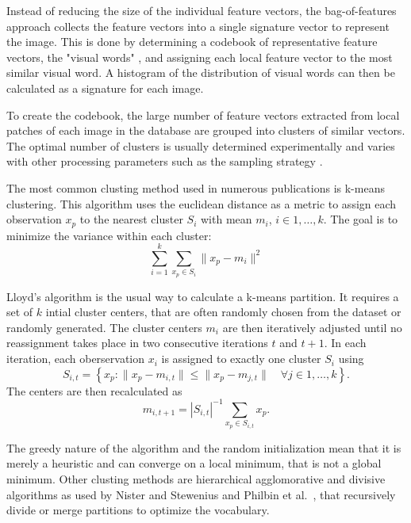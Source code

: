 Instead of reducing the size of the individual feature vectors, the
bag-of-features approach collects the feature vectors into a single signature
vector to represent the image. This is done by determining a codebook of
representative feature vectors, the "visual words" \autocite{sivic_video_2003},
and assigning each local feature vector to the most similar visual word. A
histogram of the distribution of visual words can then be calculated as a
signature for each image.

To create the codebook, the large number of feature vectors extracted from
local patches of each image in the database are grouped into clusters of
similar vectors. The optimal number of clusters is usually determined
experimentally and varies with other processing parameters such as the sampling
strategy \autocite{nowak_sampling_2006} \autocite{yang_evaluating_2007}.


The most common clusting method used in numerous publications
\autocite{zhu_theory_2002} \autocite{sivic_video_2003}
\autocite{csurka_visual_2004} \autocite{fergus_learning_2005}
\autocite{winn_object_2005} is k-means clustering. This algorithm uses the
euclidean distance as a metric to assign each observation $x_p$ to the nearest
cluster $S_i$ with mean $m_i$, $i \in 1, \dots, k$. The goal is to minimize
the variance within each cluster:
\begin{equation*}
    \sum_{i=1}^k \sum_{x_p \in S_i} \| x_p - m_i \|^2
\end{equation*}

Lloyd's algorithm is the usual way to calculate a k-means partition. It
requires a set of $k$ intial cluster centers, that are often randomly chosen
from the dataset or randomly generated. The cluster centers $m_i$ are then
iteratively adjusted until no reassignment takes place in two consecutive
iterations $t$ and $t+1$. In each iteration, each oberservation $x_i$ is
assigned to exactly one cluster $S_i$ using
\begin{equation*}
    S_{i, t} = \left\{ x_p : \| x_p - m_{i, t} \| \leq \| x_p - m_{j, t} \| \quad \forall j \in 1, \dots, k \right\}.
\end{equation*}
The centers are then recalculated as
\begin{equation*}
    m_{i, t+1} = |S_{i, t}|^{-1} \sum_{x_p \in S_{i, t}} x_p.
\end{equation*}

The greedy nature of the algorithm and the random initialization mean that it
is merely a heuristic and can converge on a local minimum, that is not a global
minimum.  Other clusting methods are hierarchical agglomorative and divisive
algorithms as used by Nister and Stewenius \autocite{nister_scalable_2006} and
Philbin et al.\ \autocite {philbin_object_2007}, that recursively divide or
merge partitions to optimize the vocabulary.

